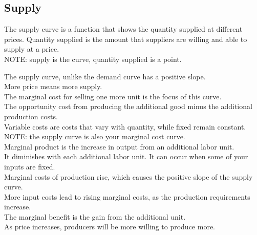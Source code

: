 \documentclass[nobib]{tufte-handout}
\begin{document}
\subsection{Supply}
The supply curve is a function that shows the quantity supplied at different
prices. Quantity supplied is the amount that suppliers are willing and able to
supply at a price. \\ NOTE: supply is the curve, quantity supplied is a
point.\\
\begin{center}
\end{center}
The supply curve, unlike the demand curve has a positive slope.\\
More price means more supply.\\
The marginal cost for selling one more unit is the focus of this curve.\\
The opportunity cost from producing the additional good minus the additional production costs.\\
Variable costs are costs that vary with quantity, while fixed remain constant.\\
NOTE: the supply curve is also your marginal cost curve.\\
Marginal product is the increase in output from an additional labor unit.\\
It diminishes with each additional labor unit. It can occur when some of your inputs are fixed.\\
Marginal costs of production rise, which causes the positive slope of the supply curve.\\
More input costs lead to rising marginal costs, as the production requirements increase.\\
The marginal benefit is the gain from the additional unit.\\
As price increases, producers will be more willing to produce more.\\
\end{document}
